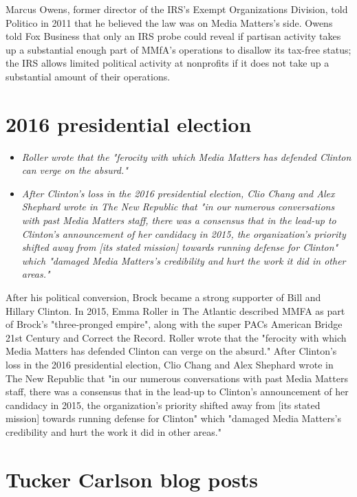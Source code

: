 Marcus Owens, former director of the IRS's Exempt Organizations
Division, told Politico in 2011 that he believed the law was on Media
Matters's side. Owens told Fox Business that only an IRS probe could
reveal if partisan activity takes up a substantial enough part of MMfA's
operations to disallow its tax-free status; the IRS allows limited
political activity at nonprofits if it does not take up a substantial
amount of their operations.

\section{2016 presidential election}\label{presidential-election}

\begin{itemize}
\item
  \emph{Roller wrote that the "ferocity with which Media Matters has
  defended Clinton can verge on the absurd."}
\item
  \emph{After Clinton's loss in the 2016 presidential election, Clio
  Chang and Alex Shephard wrote in The New Republic that "in our
  numerous conversations with past Media Matters staff, there was a
  consensus that in the lead-up to Clinton's announcement of her
  candidacy in 2015, the organization's priority shifted away from
  {[}its stated mission{]} towards running defense for Clinton" which
  "damaged Media Matters's credibility and hurt the work it did in other
  areas."}
\end{itemize}

After his political conversion, Brock became a strong supporter of Bill
and Hillary Clinton. In 2015, Emma Roller in The Atlantic described MMFA
as part of Brock's "three-pronged empire", along with the super PACs
American Bridge 21st Century and Correct the Record. Roller wrote that
the "ferocity with which Media Matters has defended Clinton can verge on
the absurd." After Clinton's loss in the 2016 presidential election,
Clio Chang and Alex Shephard wrote in The New Republic that "in our
numerous conversations with past Media Matters staff, there was a
consensus that in the lead-up to Clinton's announcement of her candidacy
in 2015, the organization's priority shifted away from {[}its stated
mission{]} towards running defense for Clinton" which "damaged Media
Matters's credibility and hurt the work it did in other areas."

\section{Tucker Carlson blog posts}\label{tucker-carlson-blog-posts}

